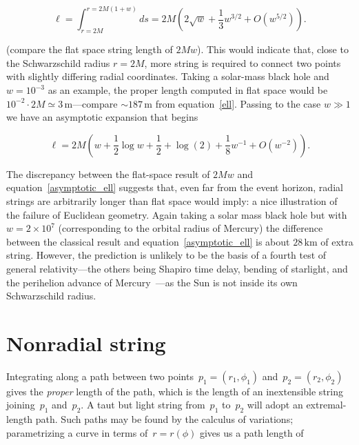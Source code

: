 \documentclass{ws-tpe}
\begin{document}
 \begin{equation}\label{ell}
   \ell =
   \int_{r=2M}^{r=2M(1+w)}ds
   =2M\left(2\sqrt{w} + \frac{1}{3}w^{3/2} + O(w^{5/2})\right).
 \end{equation}

(compare the flat space string length of $2Mw$).  This would indicate
 that, close to the Schwarzschild radius $r=2M$, more string is
 required to connect two points with slightly differing radial
 coordinates.  Taking a solar-mass black hole and $w=10^{-3}$ as an
 example, the proper length computed in flat space would be
 $10^{-2}\cdot 2M\simeq 3\,\mathrm{m}$---compare $\sim
 187\,\mathrm{m}$ from equation~\ref{ell}.  Passing to the case $w\gg
 1$ we have an asymptotic expansion that begins

% 
\begin{equation}\label{asymptotic_ell}
  \ell = 2M\left(w +  \frac{1}{2}\log w + \frac{1}{2} + \log(2)  +  \frac{1}{8}w^{-1} + O(w^{-2})\right).
\end{equation}


\noindent The discrepancy between the flat-space result of $2Mw$ and
equation~\ref{asymptotic_ell} suggests that, even far from the event
horizon, radial strings are arbitrarily longer than flat space would
imply: a nice illustration of the failure of Euclidean geometry.
Again taking a solar mass black hole but with $w=2\times 10^7$
(corresponding to the orbital radius of Mercury) the difference
between the classical result and equation~\ref{asymptotic_ell} is
about $28\,\mathrm{km}$ of extra string.  However, the prediction is
unlikely to be the basis of a fourth test of general relativity---the
others being Shapiro time delay, bending of starlight, and the
perihelion advance of Mercury~\cite{einstein1916}---as the Sun is not
inside its own Schwarzschild radius.

\section{Nonradial string}
Integrating along a path between two
points~$p_1=\left(r_1,\phi_1\right)$ and~$p_2=\left(r_2,\phi_2\right)$
gives the {\em proper} length of the path, which is the length of an
inextensible string joining~$p_1$ and~$p_2$.  A taut but light string
from~$p_1$ to~$p_2$ will adopt an extremal-length path.  Such paths
may be found by the calculus of variations; parametrizing a curve in
terms of~$r=r\left(\phi\right)$ gives us a path length of
\end{document}
